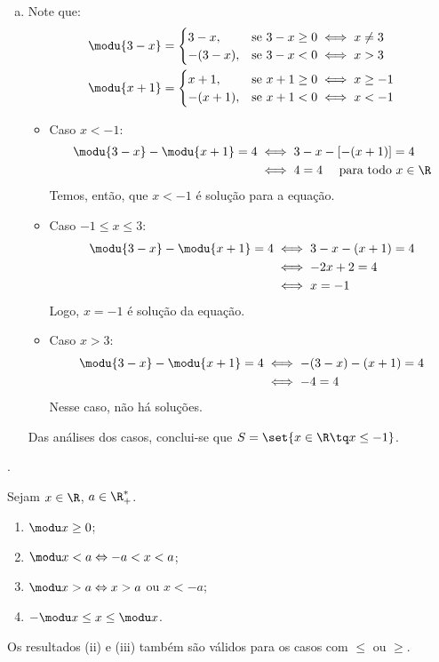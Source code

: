\begin{solution}
\begin{enumerate}[(a)]
	\item Note que:
	\begin{align*}
		& \modu{3-x}= 
		\begin{cases}
			3-x,    & \text{se } 3-x \ge 0 \iff x \ne 3 \\
			-(3-x), & \text{se } 3-x < 0 \iff x > 3
		\end{cases}\\
		& \modu{x+1}= 
		\begin{cases}
			x+1,    & \text{se } x+1 \ge 0 \iff x \ge -1 \\
			-(x+1), & \text{se } x+1 < 0 \iff x < -1
		\end{cases}
	\end{align*}
	\begin{itemize}
		\item Caso $x<-1$: 
		\begin{align*}
			\modu{3-x}-\modu{x+1}=4 &\iff 3-x-\left[-(x+1)\right]=4\\
									&\iff 4=4 \ \ \ \text{ para todo } x \in \R
		\end{align*}
		Temos, então, que $x<-1$ é solução para a equação.
		\item Caso $-1 \le x \le 3$:
		\begin{align*}
			\modu{3-x}-\modu{x+1}=4 &\iff 3-x-(x+1)=4\\
									&\iff -2x+2=4\\
									&\iff x=-1
		\end{align*}
		Logo, $x=-1$ é solução da equação.
		\item Caso $x>3$:
		\begin{align*}
			\modu{3-x}-\modu{x+1}=4 &\iff -(3-x)-(x+1)=4\\
									&\iff -4=4
		\end{align*}
		Nesse caso, não há soluções.
	\end{itemize}

	Das análises dos casos, conclui-se que $S=\set{x \in \R \tq x \le -1}$.
\end{enumerate}
\end{solution}

\begin{onlineact}
	.
\end{onlineact}

\begin{proposition}
Sejam $x \in \R$, $a\in \R^*_+ $.
%
\begin{enumerate}
  \item $\modu x \geq 0$;
  \item $\modu x < a \Leftrightarrow -a < x < a$;
  \item $\modu x > a \Leftrightarrow x > a$ ou $x < -a$;
  \item $-\modu x \leq x \leq \modu x$.
\end{enumerate}
%
Os resultados (ii) e (iii) também são válidos para os casos com $\le$ ou $\ge$.
\end{proposition}

